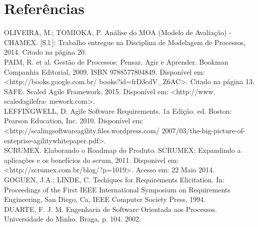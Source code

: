 \section*{Referências}
	OLIVEIRA, M.; TOMIOKA, P. Análise do MOA (Modelo de Avaliação) - CHAMEX. [S.l.]: Trabalho entregue na Disciplina de Modelagem de Processos, 2014. Citado na página 20.\\

					
	PAIM, R. et al. Gestão de Processos: Pensar, Agir e Aprender. Bookman Companhia Editorial, 2009. ISBN 9788577804849. Disponível em: <http://books.google.com.br/ books?id=frD3cdV\_Z6AC>. Citado na página 13.\\

					
	SAFE. Scaled Agile Framework. 2015. Disponível em: <http://www. scaledagilefra- mework.com>.\\ 

								
	LEFFINGWELL, D. Agile Software Requirements. 1a Edição. ed. Boston: Pearson Education, Inc. 2010. Disponível em: <http://scalingsoftwareagility.files.wordpress.com/ 2007/03/the-big-picture-of-enteprise-agilitywhitepaper.pdf>.\\


	SCRUMEX. Elaborando o Roadmap do Produto. SCRUMEX: Expandindo a aplicações e os benefícios do scrum, 2011. Disponivel em: <http://scrumex.com.br/blog/?p=1019>. Acesso em: 22 Maio 2014.\\


	GOGUEN, J.A.; LINDE, C. Techiques for Requirements Elicitation. In: Proceedings of the First IEEE International Symposium on Requirements Engineering, San Diego, Ca, IEEE Computer Society Press, 1994.\\


	DUARTE, F. J. M. Engenharia de Software Orientada aos Processos. Universidade do Minho. Braga, p. 104. 2002.\\

